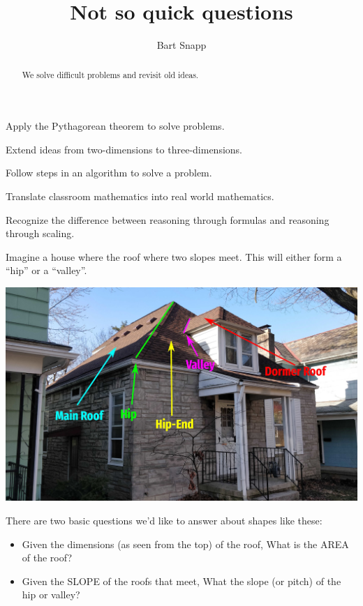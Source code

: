 \documentclass[hints,nooutcomes,noauthor]{ximera}
\title{Not so quick questions}
\author{Bart Snapp}
\begin{document}
\begin{abstract}
  We solve difficult problems and revisit old ideas.
\end{abstract}
\maketitle


\begin{listOutcomes}
\item Apply the Pythagorean theorem to solve problems.
\item Extend ideas from two-dimensions to three-dimensions.
\item Follow steps in an algorithm to solve a problem.
\item Translate classroom mathematics into real world mathematics.
\item Recognize the difference between reasoning through formulas and
  reasoning through scaling.
\end{listOutcomes}


Imagine a house where the roof where two slopes meet. This will either
form a ``hip'' or a ``valley''.
\begin{center}
  \includegraphics[width=.8\textwidth]{house.jpg}
\end{center}
There are two basic questions we'd like to answer about shapes like these:
\begin{itemize}
\item Given the dimensions (as seen from the top) of the roof, What is the AREA of the roof?
\item Given the SLOPE of the roofs that meet, What the slope (or
  pitch) of the hip or valley?
\end{itemize}


\mynewpage
\end{document}
